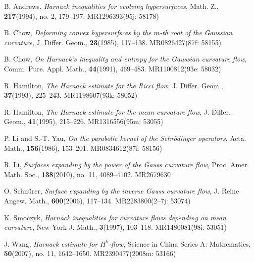 \documentclass{amsart}
\theoremstyle{definition}
\theoremstyle{remark}
\numberwithin{equation}{section}
\begin{document}

\begin{thebibliography}{10}

 B. Andrews, \textit{Harnack inequalities for evolving hypersurfaces}, Math. Z., \textbf{217}(1994), no. 2, 179--197. MR1296393(95j: 58178)

 B. Chow, \textit{Deforming convex hypersurfsces by the $m$-th root of the Gaussian curvature}, J. Differ. Geom., \textbf{23}(1985), 117--138. MR0826427(87f: 58155)

 B. Chow, \textit{On Harnack's inequality and entropy for the Gaussian curvature flow}, Comm. Pure. Appl. Math., \textbf{44}(1991), 469--483. MR1100812(93e: 58032)

 R. Hamilton, \textit{The Harnack estimate for the Ricci flow}, J. Differ. Geom., \textbf{37}(1993), 225--243. MR1198607(93k: 58052)

 R. Hamilton, \textit{The Harnack estimate for the mean curvature flow}, J. Differ. Geom.,
    \textbf{41}(1995), 215--226. MR1316556(95m: 53055)

 P. Li and S.-T. Yau, \textit{On the parabolic kernel of the Schr\"odinger operators}, Acta. Math., \textbf{156}(1986), 153--201. MR0834612(87f: 58156)

 R. Li, \textit{Surfaces expanding by the power of the Gauss curvature flow}, Proc. Amer. Math. Soc., \textbf{138}(2010), no. 11, 4089--4102. MR2679630

 O. Schn\"urer, \textit{Surface expanding by the inverse Gauss
curvature flow}, J. Reine Angew. Math., \textbf{600}(2006), 117--134. MR2283800(2--7j: 53074)

 K. Smoczyk, \textit{Harnack inequalities for curvature flows
depending on mean curvature}, New York J. Math., \textbf{3}(1997), 103--118. MR1480081(98i: 53051)

 J. Wang, \textit{Harnack estimate for $H^{k}$-flow}, Science in China Series A: Mathematics, \textbf{50}(2007), no. 11, 1642--1650. MR2390477(2008m: 53166)

\end{thebibliography}
\end{document}
